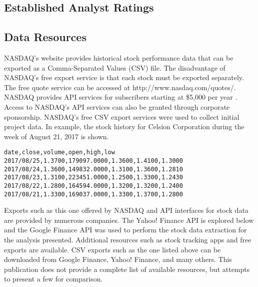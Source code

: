 \documentclass[sigconf]{acmart}
\begin{document}
\subsection{Established Analyst Ratings}

\subsection{Data Resources}
NASDAQ's website provides historical stock performance data that can be exported as a Comma-Separated Values (CSV) file. The disadvantage of NASDAQ's free export service is that each stock must be exported separately. The free quote service can be accessed at http://www.nasdaq.com/quotes/. NASDAQ provides API services for subscribers starting at \$5,000 per year \cite{www-nasdaq-sub}. Access to NASDAQ's API services can also be granted through corporate sponsorship. NASDAQ's free CSV export services were used to collect initial project data. In example, the stock history for Celsion Corporation during the week of August 21, 2017 is shown.

\begin{mdframed}[style=default]
\begin{lstlisting}
date,close,volume,open,high,low
2017/08/25,1.3700,179097.0000,1.3600,1.4100,1.3000
2017/08/24,1.3600,149832.0000,1.3100,1.3600,1.2810
2017/08/23,1.3100,223451.0000,1.2500,1.3300,1.2430
2017/08/22,1.2800,164594.0000,1.3200,1.3200,1.2400
2017/08/21,1.3300,169037.0000,1.3300,1.3700,1.2800
\end{lstlisting}
\end{mdframed} 

Exports such as this one offered by NASDAQ and API interfaces for stock data are provided by numerous companies. The Yahoo! Finance API is explored below and the Google Finance API was used to perform the stock data extraction for the analysis presented. Additional resources such as stock tracking apps and free exports are available. CSV exports such as the one listed above can be downloaded from Google Finance, Yahoo! Finance, and many others. This publication does not provide a complete list of available resources, but attempts to present a few for comparison. 
\end{document}
